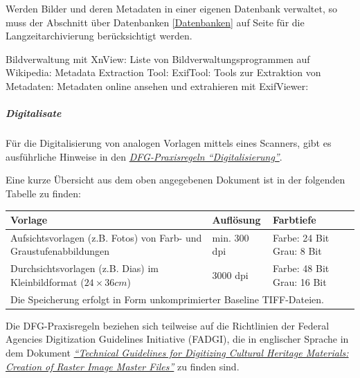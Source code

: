Werden Bilder und deren Metadaten in einer eigenen Datenbank verwaltet, so muss der Abschnitt über Datenbanken \ref{Datenbanken} auf Seite \pageref{Datenbanken} für die Langzeitarchivierung berücksichtigt werden.

\begin{flushleft}
	Bildverwaltung mit XnView: 
	Liste von Bildverwaltungsprogrammen auf Wikipedia: 
	Metadata Extraction Tool: 
	ExifTool: 
	Tools zur Extraktion von Metadaten: 
	Metadaten online ansehen und extrahieren mit ExifViewer: 
\end{flushleft}

\subparagraph{Digitalisate} \label{Digitalisate-Bilder} Für die Digitalisierung von analogen Vorlagen mittels eines Scanners, gibt es ausführliche Hinweise in den \href{http://www.dfg.de/download/pdf/foerderung/programme/lis/praxisregeln_digitalisierung_2013.pdf}{\emph{DFG-Praxisregeln "`Digitalisierung"'}}.

Eine kurze Übersicht aus dem oben angegebenen Dokument ist in der folgenden Tabelle zu finden:

\begin{center}
	\begin{tabular}{p{} l p{}}
		\toprule
		Vorlage & Auflösung & Farbtiefe \\ \midrule
		Aufsichtsvorlagen (z.B. Fotos) von Farb- und Graustufenabbildungen & min. 300 dpi & Farbe: 24 Bit \newline Grau: 8 Bit \\
		Durchsichtsvorlagen (z.B. Dias) im Kleinbildformat ($24\times 36 cm$) & 3000 dpi & Farbe: 48 Bit \newline Grau: 16 Bit\\ \cmidrule(r){1-3}
		\multicolumn{3}{l}{Die Speicherung erfolgt in Form unkomprimierter Baseline TIFF-Dateien.} \\
		\bottomrule    
	\end{tabular}
\end{center}

Die DFG-Praxisregeln beziehen sich teilweise auf die Richtlinien der Federal Agencies Digitization Guidelines Initiative (FADGI), die in englischer Sprache in dem Dokument \href{http://www.digitizationguidelines.gov/guidelines/FADGI_Still_Image-Tech_Guidelines_2010-08-24.pdf}{\emph{"`Technical Guidelines for Digitizing Cultural Heritage Materials: Creation of Raster Image Master Files"'}} zu finden sind.

